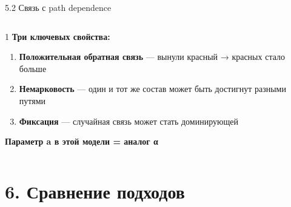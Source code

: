 \documentclass[
  ignorenonframetext,
  aspectratio=169,
  russian,
]{beamer}
\providecommand{\tightlist}{%
  \setlength{\itemsep}{0pt}\setlength{\parskip}{0pt}}
\begin{document}
\begin{frame}{5.2 Связь с path dependence}
\label{ux441ux432ux44fux437ux44c-ux441-path-dependence}
\begin{columns}[T]
\begin{column}{1\linewidth}
\textbf{Три ключевых свойства:}

\begin{enumerate}
\tightlist
\item
  \textbf{Положительная обратная связь} --- вынули красный → красных
  стало больше
\item
  \textbf{Немарковость} --- один и тот же состав может быть достигнут
  разными путями
\item
  \textbf{Фиксация} --- случайная связь может стать доминирующей
\end{enumerate}

\textbf{Параметр a в этой модели = аналог α}
\end{column}
\end{columns}
\end{frame}

\section{6. Сравнение
подходов}\label{ux441ux440ux430ux432ux43dux435ux43dux438ux435-ux43fux43eux434ux445ux43eux434ux43eux432}
\end{document}
